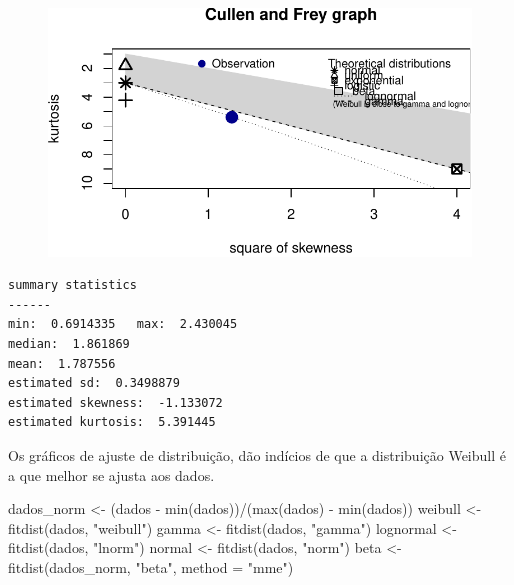 \documentclass[
  letterpaper,
  DIV=11,
  numbers=noendperiod]{scrartcl}
\newenvironment{Shaded}{\begin{snugshade}}{\end{snugshade}}
\newcommand{\AttributeTok}[1]{\textcolor[rgb]{0.40,0.45,0.13}{#1}}
\newcommand{\FunctionTok}[1]{\textcolor[rgb]{0.28,0.35,0.67}{#1}}
\newcommand{\NormalTok}[1]{\textcolor[rgb]{0.00,0.23,0.31}{#1}}
\newcommand{\OtherTok}[1]{\textcolor[rgb]{0.00,0.23,0.31}{#1}}
\newcommand{\SpecialCharTok}[1]{\textcolor[rgb]{0.37,0.37,0.37}{#1}}
\newcommand{\StringTok}[1]{\textcolor[rgb]{0.13,0.47,0.30}{#1}}
\begin{document}
\begin{figure}[H]

{\centering \includegraphics{quiz5_files/figure-pdf/unnamed-chunk-11-1.pdf}

}

\end{figure}

\begin{verbatim}
summary statistics
------
min:  0.6914335   max:  2.430045 
median:  1.861869 
mean:  1.787556 
estimated sd:  0.3498879 
estimated skewness:  -1.133072 
estimated kurtosis:  5.391445 
\end{verbatim}

Os gráficos de ajuste de distribuição, dão indícios de que a
distribuição Weibull é a que melhor se ajusta aos dados.

\begin{Shaded}
\begin{Highlighting}[]
\NormalTok{dados\_norm }\OtherTok{\textless{}{-}}\NormalTok{ (dados }\SpecialCharTok{{-}} \FunctionTok{min}\NormalTok{(dados))}\SpecialCharTok{/}\NormalTok{(}\FunctionTok{max}\NormalTok{(dados) }\SpecialCharTok{{-}} \FunctionTok{min}\NormalTok{(dados))}
\NormalTok{weibull }\OtherTok{\textless{}{-}} \FunctionTok{fitdist}\NormalTok{(dados, }\StringTok{"weibull"}\NormalTok{)}
\NormalTok{gamma }\OtherTok{\textless{}{-}} \FunctionTok{fitdist}\NormalTok{(dados, }\StringTok{"gamma"}\NormalTok{)}
\NormalTok{lognormal }\OtherTok{\textless{}{-}} \FunctionTok{fitdist}\NormalTok{(dados, }\StringTok{"lnorm"}\NormalTok{)}
\NormalTok{normal }\OtherTok{\textless{}{-}} \FunctionTok{fitdist}\NormalTok{(dados, }\StringTok{"norm"}\NormalTok{)}
\NormalTok{beta }\OtherTok{\textless{}{-}} \FunctionTok{fitdist}\NormalTok{(dados\_norm, }\StringTok{"beta"}\NormalTok{, }\AttributeTok{method =} \StringTok{"mme"}\NormalTok{)}
\end{Highlighting}
\end{Shaded}
\end{document}
